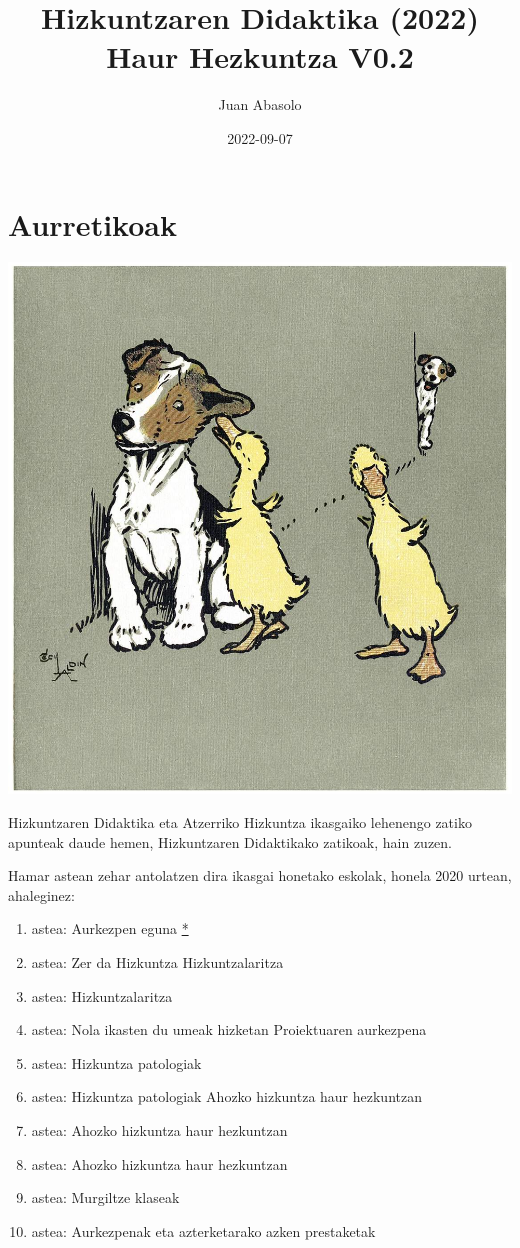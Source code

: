 \documentclass[
]{book}
\title{Hizkuntzaren Didaktika (2022) Haur Hezkuntza V0.2}
\author{Juan Abasolo}
\date{2022-09-07}
\providecommand{\tightlist}{%
  \setlength{\itemsep}{0pt}\setlength{\parskip}{0pt}}
\begin{document}
\maketitle

{
\setcounter{tocdepth}{1}
\tableofcontents
}
\hypertarget{Aurretikoak}{%
\chapter*{Aurretikoak}\label{Aurretikoak}}

\includegraphics{assets/scare-quacks-1200.jpg}

Hizkuntzaren Didaktika eta Atzerriko Hizkuntza ikasgaiko lehenengo zatiko apunteak daude hemen, Hizkuntzaren Didaktikako zatikoak, hain zuzen.

Hamar astean zehar antolatzen dira ikasgai honetako eskolak, honela 2020 urtean, ahaleginez:

\begin{enumerate}
\def\labelenumi{\arabic{enumi}.}
\tightlist
\item
  astea: Aurkezpen eguna \href{../diapoak/}{*}
\item
  astea: Zer da Hizkuntza \textbar{} Hizkuntzalaritza
\item
  astea: Hizkuntzalaritza
\item
  astea: Nola ikasten du umeak hizketan \textbar{} Proiektuaren aurkezpena
\item
  astea: Hizkuntza patologiak
\item
  astea: Hizkuntza patologiak \textbar{} Ahozko hizkuntza haur hezkuntzan
\item
  astea: Ahozko hizkuntza haur hezkuntzan
\item
  astea: Ahozko hizkuntza haur hezkuntzan
\item
  astea: Murgiltze klaseak
\item
  astea: Aurkezpenak eta azterketarako azken prestaketak
\end{enumerate}
\end{document}
